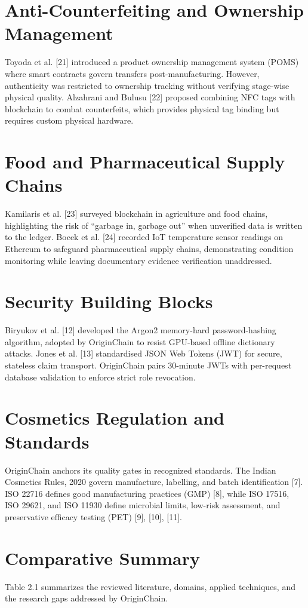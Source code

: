 \documentclass[12pt,a4paper]{report}
\begin{document}
\section{Anti-Counterfeiting and Ownership Management}
Toyoda et al. [21] introduced a product ownership management system (POMS) where smart contracts govern transfers post-manufacturing. However, authenticity was restricted to ownership tracking without verifying stage-wise physical quality. Alzahrani and Bulusu [22] proposed combining NFC tags with blockchain to combat counterfeits, which provides physical tag binding but requires custom physical hardware.

\section{Food and Pharmaceutical Supply Chains}
Kamilaris et al. [23] surveyed blockchain in agriculture and food chains, highlighting the risk of ``garbage in, garbage out'' when unverified data is written to the ledger. Bocek et al. [24] recorded IoT temperature sensor readings on Ethereum to safeguard pharmaceutical supply chains, demonstrating condition monitoring while leaving documentary evidence verification unaddressed.

\section{Security Building Blocks}
Biryukov et al. [12] developed the Argon2 memory-hard password-hashing algorithm, adopted by OriginChain to resist GPU-based offline dictionary attacks. Jones et al. [13] standardised JSON Web Tokens (JWT) for secure, stateless claim transport. OriginChain pairs 30-minute JWTs with per-request database validation to enforce strict role revocation.

\section{Cosmetics Regulation and Standards}
OriginChain anchors its quality gates in recognized standards. The Indian Cosmetics Rules, 2020 govern manufacture, labelling, and batch identification [7]. ISO 22716 defines good manufacturing practices (GMP) [8], while ISO 17516, ISO 29621, and ISO 11930 define microbial limits, low-risk assessment, and preservative efficacy testing (PET) [9], [10], [11].

\section{Comparative Summary}
Table 2.1 summarizes the reviewed literature, domains, applied techniques, and the research gaps addressed by OriginChain.
\end{document}
